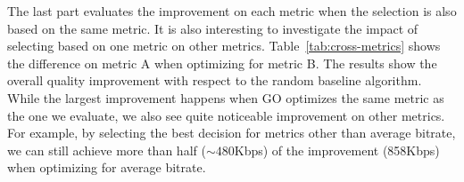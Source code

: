 \begin{figure}[h!]
\centering
{}
\hspace{-0.6cm}
\hspace{-0.6cm}
\hspace{-0.6cm}
\label{fig:improve}
\end{figure}


The last part evaluates the improvement on each metric when the selection is also based on the same metric. It is also interesting to investigate the impact of selecting based on one metric on other metrics. Table~\ref{tab:cross-metrics} shows the difference on metric A when optimizing for metric B. The results show the overall quality improvement with respect to the random baseline algorithm. 
While the largest improvement happens when GO optimizes the same metric as the one we evaluate, we also see quite noticeable improvement on other metrics. For example, by selecting the best decision for metrics other than average bitrate, we can still achieve more than half ($\sim 480$Kbps) of the improvement (858Kbps) when optimizing for average bitrate.

